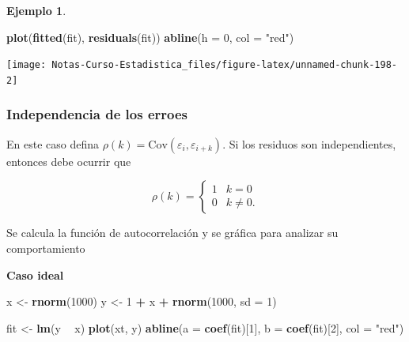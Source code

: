 \documentclass[
  12pt,
]{book}
\newenvironment{Shaded}{\begin{snugshade}}{\end{snugshade}}
\newcommand{\DataTypeTok}[1]{\textcolor[rgb]{0.13,0.29,0.53}{#1}}
\newcommand{\DecValTok}[1]{\textcolor[rgb]{0.00,0.00,0.81}{#1}}
\newcommand{\KeywordTok}[1]{\textcolor[rgb]{0.13,0.29,0.53}{\textbf{#1}}}
\newcommand{\NormalTok}[1]{#1}
\newcommand{\OperatorTok}[1]{\textcolor[rgb]{0.81,0.36,0.00}{\textbf{#1}}}
\newcommand{\StringTok}[1]{\textcolor[rgb]{0.31,0.60,0.02}{#1}}
\theoremstyle{definition}
\theoremstyle{definition}
\newtheorem{example}{Ejemplo}[chapter]
\theoremstyle{definition}
\theoremstyle{remark}
\begin{document}
\begin{example}
\begin{Shaded}
\begin{Highlighting}[]
\KeywordTok{plot}\NormalTok{(}\KeywordTok{fitted}\NormalTok{(fit), }\KeywordTok{residuals}\NormalTok{(fit))}
\KeywordTok{abline}\NormalTok{(}\DataTypeTok{h =} \DecValTok{0}\NormalTok{, }\DataTypeTok{col =} \StringTok{"red"}\NormalTok{)}
\end{Highlighting}
\end{Shaded}

\begin{center}\texttt{[image: Notas-Curso-Estadistica\_files/figure-latex/unnamed-chunk-198-2]} \end{center}

\end{example}

\hypertarget{independencia-de-los-erroes}{%
\subsubsection{Independencia de los erroes}\label{independencia-de-los-erroes}}

En este caso defina \(\rho(k) = \text{Cov}(\varepsilon_i,\varepsilon_{i+k} )\). Si los residuos son independientes, entonces debe ocurrir que

\begin{equation*}
\rho(k) = \begin{cases}
1 & k=0\\
0 & k\neq 0.
\end{cases}  
\end{equation*}

Se calcula la función de autocorrelación y se gráfica para analizar su comportamiento

\textbf{Caso ideal}

\begin{Shaded}
\begin{Highlighting}[]
\NormalTok{x <-}\StringTok{ }\KeywordTok{rnorm}\NormalTok{(}\DecValTok{1000}\NormalTok{)}
\NormalTok{y <-}\StringTok{ }\DecValTok{1} \OperatorTok{+}\StringTok{ }\NormalTok{x }\OperatorTok{+}\StringTok{ }\KeywordTok{rnorm}\NormalTok{(}\DecValTok{1000}\NormalTok{, }\DataTypeTok{sd =} \DecValTok{1}\NormalTok{)}
\end{Highlighting}
\end{Shaded}

\begin{Shaded}
\begin{Highlighting}[]
\NormalTok{fit <-}\StringTok{ }\KeywordTok{lm}\NormalTok{(y }\OperatorTok{~}\StringTok{ }\NormalTok{x)}
\KeywordTok{plot}\NormalTok{(xt, y)}
\KeywordTok{abline}\NormalTok{(}\DataTypeTok{a =} \KeywordTok{coef}\NormalTok{(fit)[}\DecValTok{1}\NormalTok{], }\DataTypeTok{b =} \KeywordTok{coef}\NormalTok{(fit)[}\DecValTok{2}\NormalTok{], }\DataTypeTok{col =} \StringTok{"red"}\NormalTok{)}
\end{Highlighting}
\end{Shaded}
\end{document}
